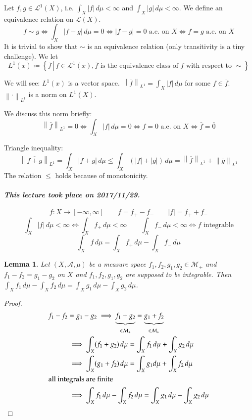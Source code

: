 \documentclass{article}
\newtheorem{lemma}{Lemma}  \numberwithin{lemma}{section}
\newcommand{\setdef}[2]{\left\{\left.#1\,\right|\,#2\right\}}
\newcommand{\norm}[1]{\left\|#1\right\|}
\newcommand{\card}[1]{\left|#1\right|}
\newcommand{\dateref}[1]{\paragraph{\textit{This lecture took place on #1.}}}
\begin{document}
Let $f,g \in \mathcal L^1(X)$, i.e. $\int_X \card{f} \, d\mu < \infty$ and $\int_X \card{g} \, d\mu < \infty$.
We define an equivalence relation on $\mathcal L(X)$.
\[ f \sim g \iff \int_X \card{f - g} \, d\mu = 0 \iff \card{f - g} = 0 \text{ a.e. on } X \iff f = g \text{ a.e. on } X \]
It is trivial to show that $\sim$ is an equivalence relation (only transitivity is a tiny challenge).
We let
\[ L^1(x) \coloneqq \setdef{\overline{f}}{f \in \mathcal L^1(x), \overline{f} \text{ is the equivalence class of $f$ with respect to $\sim$}} \]

We will see: $L^1(x)$ is a vector space.
$\norm{\overline{f}}_{L^1} = \int_X \card{f} \, d\mu$ for some $f \in \overline{f}$.
$\norm{\cdot}_{L^1}$ is a norm on $L^1(X)$.

We discuss this norm briefly:
\[ \norm{\overline{f}}_{L^1} = 0 \iff \int_X \card{f} \, d\mu = 0 \iff f = 0 \text{ a.e. on } X \iff \overline{f} = \overline{0} \]

Triangle inequality:
\[ \norm{\overline{f+g}}_{L^1} = \int_X \card{f+g} \, d\mu \leq \int_X (\card{f} + \card{g}) \, d\mu = \norm{\overline{f}}_{L^1} + \norm{\overline{g}}_{L^1}  \]
The relation $\leq$ holds because of monotonicity.

\dateref{2017/11/29}

\[ f: X \to [-\infty, \infty] \qquad f = f_+ - f_- \qquad \card{f} = f_+ + f_- \]
\[ \int_X \card{f} \, d\mu < \infty \iff \int_X f_+ \, d\mu < \infty \qquad \int_X f_- \, d\mu < \infty \iff f \text{ integrable} \]
\[ \int_X f \, d\mu = \int_X f_+ \, d\mu - \int_X f_- \, d\mu \]

\begin{lemma} %
  Let $(X, \mathcal A, \mu)$ be a measure space $f_1, f_2, g_1, g_2 \in \mathcal M_+$ and $f_1 - f_2 = g_1 - g_2$ on $X$
  and $f_1, f_2, g_1, g_2$ are supposed to be integrable. Then $\int_X f_1 \, d\mu - \int_X f_2 \, d\mu = \int_X g_1 \, d\mu - \int_X g_2 \, d\mu$.
\end{lemma}
\begin{proof}
  \begin{align*}
    f_1 - f_2 &= g_1 - g_2 \implies \underbrace{f_1 + g_2}_{\in \mathcal M_+} = \underbrace{g_1 + f_2}_{\in \mathcal M_+} \\
      &\implies \int_X (f_1 + g_2) \, d\mu = \int_X f_1 \, d\mu + \int_X g_2 \, d\mu \\
      &\implies \int_X (g_1 + f_2) \, d\mu = \int_X g_1 d\mu + \int_X f_2 \, d\mu \\
  \intertext{all integrals are finite}
      &\implies \int_X f_1 \, d\mu - \int_X f_2 \, d\mu = \int_X g_1 \, d\mu - \int_X g_2 \, d\mu
  \end{align*}
\end{proof}
\end{document}
